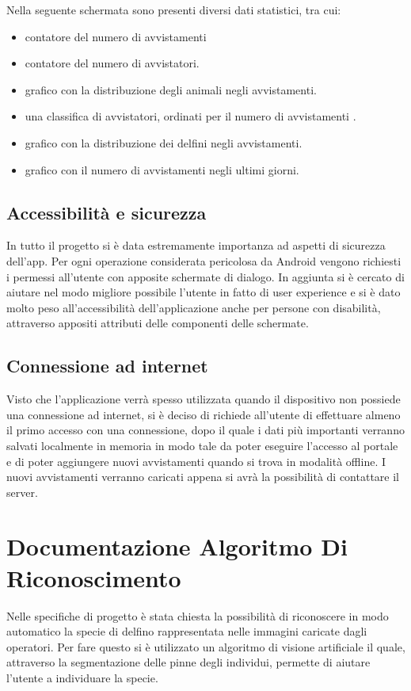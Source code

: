 \documentclass[a4paper,final,12pt]{report}
\begin{document}
Nella seguente schermata sono presenti diversi dati statistici, tra cui:
\begin{itemize}
    \item contatore del numero di avvistamenti
    \item contatore del numero di avvistatori.
    \item grafico con la distribuzione degli animali negli avvistamenti.
    \item una classifica di avvistatori, ordinati per il numero di avvistamenti .
    \item grafico con la distribuzione dei delfini negli avvistamenti.
    \item grafico con il numero di avvistamenti negli ultimi giorni.
\end{itemize}

\section{Accessibilità e sicurezza}
In tutto il progetto si è data estremamente importanza ad aspetti di sicurezza dell'app. Per ogni operazione considerata pericolosa da Android vengono richiesti i permessi all'utente con apposite schermate di dialogo. In aggiunta si è cercato di aiutare nel modo migliore possibile l'utente in fatto di user experience e si è dato molto peso all'accessibilità dell'applicazione anche per persone con disabilità, attraverso appositi attributi delle componenti delle schermate.

\section{Connessione ad internet}
Visto che l'applicazione verrà spesso utilizzata quando il dispositivo non possiede una connessione ad internet, si è deciso di richiede all'utente di effettuare almeno il primo accesso con una connessione, dopo il quale i dati più importanti verranno salvati localmente in memoria in modo tale da poter eseguire l'accesso al portale e di poter aggiungere nuovi avvistamenti quando si trova in modalità offline. I nuovi avvistamenti verranno caricati appena si avrà la possibilità di contattare il server.


\chapter{Documentazione Algoritmo Di Riconoscimento}
Nelle specifiche di progetto è stata chiesta la possibilità di riconoscere in modo automatico la specie di delfino rappresentata nelle immagini caricate dagli operatori. Per fare questo si è utilizzato un algoritmo di visione artificiale il quale, attraverso la segmentazione delle pinne degli individui, permette di aiutare l'utente a individuare la specie.
\end{document}
